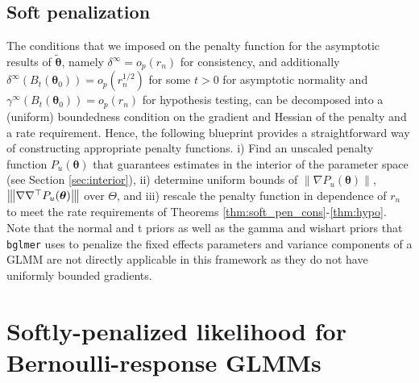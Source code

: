 \documentclass[11pt, a4paper]{article}
\newcommand*{\bb}{\boldsymbol}
\newcommand{\vnorm}[1]{\ensuremath{{\left\| #1 \right\|}}}
\newcommand{\mnorm}[1]{{\left\vert\kern-0.25ex\left\vert\kern-0.25ex\left\vert #1 
		\right\vert\kern-0.25ex\right\vert\kern-0.25ex\right\vert}}
\theoremstyle{example} \newtheorem{example}{Example}[section]
\theoremstyle{theorem} \newtheorem{theorem}{Theorem}[section]
\def\btheta{\bb{\theta}}
\def\btnod{\bb{\theta}_0}
\def\bttilde{\tilde{\bb{\theta}}}
\begin{document}
\subsection{Soft penalization}
\label{sec:soft_pen}
The conditions that we imposed on the penalty function for the asymptotic results of $\bttilde$, namely $\delta^\infty = o_p(r_n)$ for consistency, and additionally $\delta^\infty(B_t(\btnod)) = o_p(r_n^{1/2})$ for some $t>0$ for asymptotic normality and $\gamma^\infty(B_t(\btnod)) = o_p(r_n)$ for hypothesis testing, can be decomposed into a (uniform) boundedness condition on the gradient and Hessian of the penalty and a rate requirement. Hence, the following blueprint provides a straightforward way of constructing appropriate penalty functions. i) Find an unscaled penalty function $P_u(\btheta)$ that guarantees estimates in the interior of the parameter space (see Section \ref{sec:interior}), ii) determine uniform bounds of $\vnorm{\nabla P_u(\btheta)}$, $\mnorm{\nabla \nabla^\top P_u(\btheta)}$ over $\Theta$, and iii) rescale the penalty function in dependence of $r_n$ to meet the rate requirements of Theorems \ref{thm:soft_pen_cons}-\ref{thm:hypo}.
Note that the normal and t priors as well as the gamma and wishart priors that \texttt{bglmer} uses to penalize the fixed effects parameters and variance components of a GLMM are not directly applicable in this framework as they do not have uniformly bounded gradients.
\section{Softly-penalized likelihood for Bernoulli-response GLMMs}
\label{sec:glmm_penalties}
\end{document}
